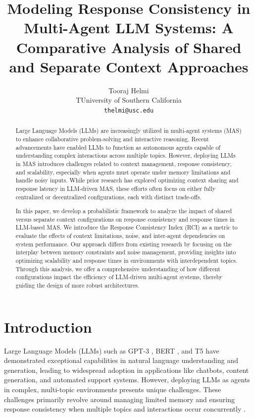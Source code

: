 \documentclass{article}
\title{Modeling Response Consistency in Multi-Agent LLM Systems: A Comparative Analysis of Shared and Separate Context Approaches}
\author{Tooraj Helmi \\
TUniversity of Southern California \\
\texttt{thelmi@usc.edu}
}
\begin{document}
\maketitle

\begin{abstract}
Large Language Models (LLMs) are increasingly utilized in multi-agent systems (MAS) to enhance collaborative problem-solving and interactive reasoning. Recent advancements have enabled LLMs to function as autonomous agents capable of understanding complex interactions across multiple topics. However, deploying LLMs in MAS introduces challenges related to context management, response consistency, and scalability, especially when agents must operate under memory limitations and handle noisy inputs. While prior research has explored optimizing context sharing and response latency in LLM-driven MAS, these efforts often focus on either fully centralized or decentralized configurations, each with distinct trade-offs.

In this paper, we develop a probabilistic framework to analyze the impact of shared versus separate context configurations on response consistency and response times in LLM-based MAS. We introduce the Response Consistency Index (RCI) as a metric to evaluate the effects of context limitations, noise, and inter-agent dependencies on system performance. Our approach differs from existing research by focusing on the interplay between memory constraints and noise management, providing insights into optimizing scalability and response times in environments with interdependent topics. Through this analysis, we offer a comprehensive understanding of how different configurations impact the efficiency of LLM-driven multi-agent systems, thereby guiding the design of more robust architectures.
\end{abstract}

\section{Introduction}
\label{sec:intro}
Large Language Models (LLMs) such as GPT-3 \citep{brown2020gpt3}, BERT \citep{devlin2018bert}, and T5 \citep{raffel2020exploring} have demonstrated exceptional capabilities in natural language understanding and generation, leading to widespread adoption in applications like chatbots, content generation, and automated support systems. However, deploying LLMs as agents in complex, multi-topic environments presents unique challenges. These challenges primarily revolve around managing limited memory and ensuring response consistency when multiple topics and interactions occur concurrently \citep{wooldridge2009introduction, stone2000multiagent}.
\end{document}
